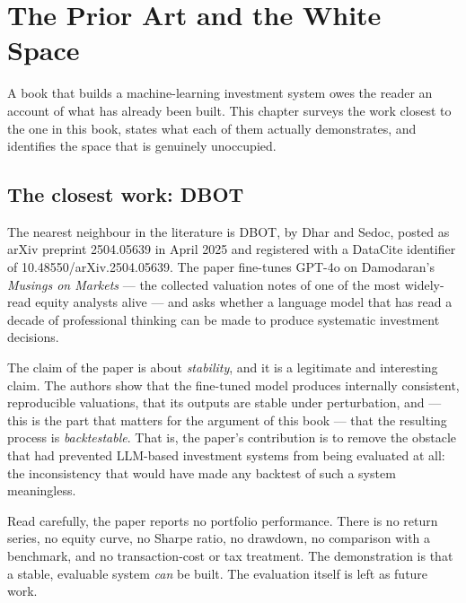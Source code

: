 
\chapter{The Prior Art and the White Space}
\label{ch:prior-art}

A book that builds a machine-learning investment system owes the reader an
account of what has already been built. This chapter surveys the work
closest to the one in this book, states what each of them actually
demonstrates, and identifies the space that is genuinely unoccupied.

\section{The closest work: DBOT}

The nearest neighbour in the literature is DBOT, by Dhar and Sedoc, posted
as arXiv preprint 2504.05639 in April 2025 and registered with a DataCite
identifier of 10.48550/arXiv.2504.05639. The paper fine-tunes GPT-4o on
Damodaran's \emph{Musings on Markets} --- the collected valuation notes of
one of the most widely-read equity analysts alive --- and asks whether a
language model that has read a decade of professional thinking can be
made to produce systematic investment decisions.

The claim of the paper is about \emph{stability}, and it is a legitimate and
interesting claim. The authors show that the fine-tuned model produces
internally consistent, reproducible valuations, that its outputs are stable
under perturbation, and --- this is the part that matters for the
argument of this book --- that the resulting process is \emph{backtestable}.
That is, the paper's contribution is to remove the obstacle that had
prevented LLM-based investment systems from being evaluated at all: the
inconsistency that would have made any backtest of such a system
meaningless.

Read carefully, the paper reports no portfolio performance. There is no
return series, no equity curve, no Sharpe ratio, no drawdown, no comparison
with a benchmark, and no transaction-cost or tax treatment. The
demonstration is that a stable, evaluable system \emph{can} be built. The
evaluation itself is left as future work.

